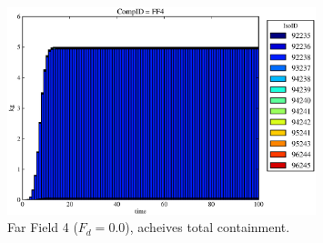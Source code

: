 \begin{frame}
\begin{figure}
\begin{minipage}[b]{0.45\linewidth}
  \includegraphics[width=0.8\textwidth]{./images/drIV0.eps}
  \caption[Case DRIV WP Contaminants.]{ 
    Far Field 4 ($F_d = 0.0$), acheives total containment.
    }
  \label{fig:drIVff0}


  \end{minipage}
\end{figure}
\end{frame}
